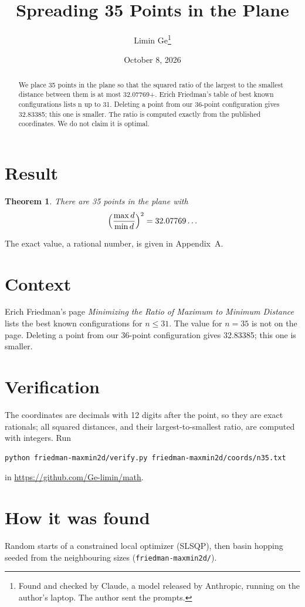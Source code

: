 \documentclass[11pt,a4paper]{article}
\title{Spreading 35 Points in the Plane}
\author{Limin Ge\thanks{Found and checked by Claude, a model released by Anthropic, running on the author's laptop. The author sent the prompts.}}
\date{October 8, 2026}
\newtheorem*{theorem}{Theorem}
\begin{document}
\maketitle
\begin{abstract}
We place 35 points in the plane so that the squared ratio of the largest to the smallest distance between them is at most 32.07769+. Erich Friedman's table of best known configurations lists n up to 31. Deleting a point from our 36-point configuration gives 32.83385; this one is smaller. The ratio is computed exactly from the published coordinates. We do not claim it is optimal.
\end{abstract}

\section{Result}
\begin{theorem}
There are 35 points in the plane with
\[ \Bigl(\frac{\max d}{\min d}\Bigr)^2 = 32.07769\ldots \]
\end{theorem}
The exact value, a rational number, is given in Appendix~A.


\section{Context}
Erich Friedman's page \emph{Minimizing the Ratio of Maximum to Minimum Distance} lists the best known configurations for $n\le 31$. The value for $n=35$ is not on the page. Deleting a point from our 36-point configuration gives 32.83385; this one is smaller.


\section{Verification}
The coordinates are decimals with 12 digits after the point, so they are exact rationals; all squared distances, and their largest-to-smallest ratio, are computed with integers. Run
\begin{verbatim}
python friedman-maxmin2d/verify.py friedman-maxmin2d/coords/n35.txt
\end{verbatim}
in \url{https://github.com/Ge-limin/math}.


\section{How it was found}
Random starts of a constrained local optimizer (SLSQP), then basin hopping seeded from the neighbouring sizes (\texttt{friedman-maxmin2d/}).
\end{document}
